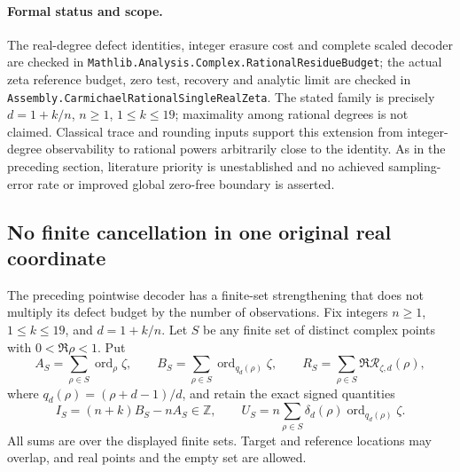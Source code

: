 \paragraph{Formal status and scope.}
The real-degree defect identities, integer erasure cost and complete
scaled decoder are checked in
\texttt{Mathlib.Analysis.Complex.RationalResidueBudget}; the actual
zeta reference budget, zero test, recovery and analytic limit are checked
in \texttt{Assembly.CarmichaelRationalSingleRealZeta}. The stated family
is precisely \(d=1+k/n\), \(n\ge1\), \(1\le k\le19\); maximality
among rational degrees is not claimed. Classical trace and rounding inputs
support this extension from integer-degree observability to rational
powers arbitrarily close to the identity. As in the preceding section,
literature priority is unestablished and no achieved sampling-error rate
or improved global zero-free boundary is asserted.

\subsection{No finite cancellation in one original real coordinate}
\label{sec:finite-real-packet}

The preceding pointwise decoder has a finite-set strengthening that does
not multiply its defect budget by the number of observations. Fix integers
\(n\ge1\), \(1\le k\le19\), and \(d=1+k/n\). Let \(S\) be any finite
set of distinct complex points with \(0<\Re\rho<1\). Put
\[
 A_S=\sum_{\rho\in S}\operatorname{ord}_{\rho}\zeta,\qquad
 B_S=\sum_{\rho\in S}\operatorname{ord}_{q_d(\rho)}\zeta,\qquad
 R_S=\sum_{\rho\in S}\Re\mathcal R_{\zeta,d}(\rho),
\]
where \(q_d(\rho)=(\rho+d-1)/d\), and retain the exact signed quantities
\[
 I_S=(n+k)B_S-nA_S\in\mathbb Z,\qquad
 U_S=n\sum_{\rho\in S}\delta_d(\rho)
            \operatorname{ord}_{q_d(\rho)}\zeta.
\]
All sums are over the displayed finite sets. Target and reference locations
may overlap, and real points and the empty set are allowed.

